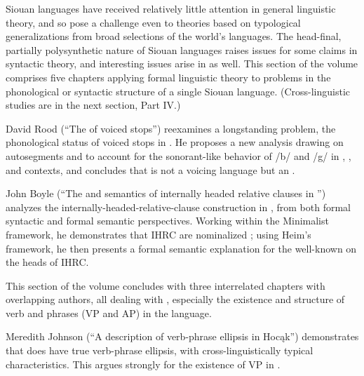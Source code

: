 \begin{refsection}

Siouan languages have received relatively little attention in general linguistic theory, and so pose a challenge even to theories based on typological generalizations from broad selections of the world's languages. The head-final, partially polysynthetic nature of Siouan languages raises issues for some claims in syntactic theory, and interesting issues arise in  as well. This section of the volume comprises five chapters applying formal linguistic theory to problems in the phonological or syntactic structure of a single Siouan language. (Cross-linguistic studies are in the next section, Part IV.)

David Rood (``The  of  voiced stops'') reexamines a longstanding problem, the phonological status of voiced stops in . He proposes a new analysis drawing on autosegments and  to account for the sonorant-like behavior of /b/ and /g/ in , , and  contexts, and concludes that  is not a voicing language but an . 

John Boyle (``The  and semantics of internally headed relative clauses in '') analyzes the internally-headed-relative-clause construction in , from both formal syntactic and formal semantic perspectives. Working within the Minimalist framework, he demonstrates that  IHRC are nominalized ; using Heim's framework, he then presents a formal semantic explanation for the well-known  on the heads of IHRC. 

This section of the volume concludes with three interrelated chapters with overlapping authors, all dealing with  , especially the existence and structure of verb and  phrases (VP and AP) in the language.

Meredith Johnson (``A description of verb-phrase ellipsis in Hoc\k{a}k'') demonstrates that  does have true verb-phrase ellipsis, with cross-linguistically typical characteristics. This argues strongly for the existence of VP in .


\end{refsection}
